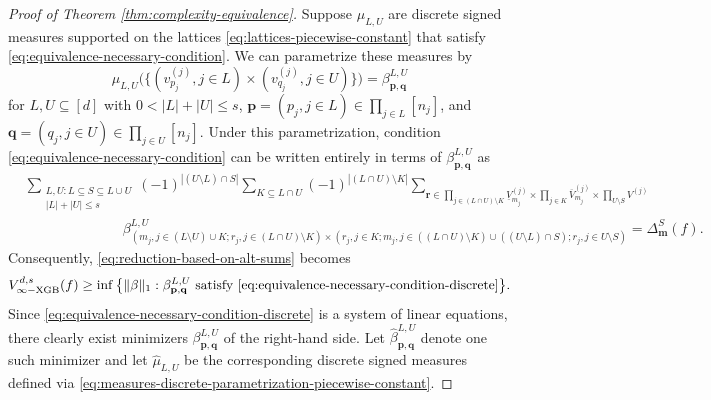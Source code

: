 \documentclass[10pt]{article}
\newcommand{\vinfxgb}{{V^{d, s}_{\infty-\text{XGB}}}}
\newcommand{\pbf}{{\mathbf{p}}}
\newcommand{\qbf}{{\mathbf{q}}}
\newcommand{\rbf}{{\mathbf{r}}}
\newcommand{\mbf}{{\mathbf{m}}}
\begin{document}
\begin{proof}[Proof of Theorem \ref{thm:complexity-equivalence}]
Suppose $\mu_{L, U}$ are discrete signed measures 
supported on the lattices \eqref{eq:lattices-piecewise-constant} that 
satisfy \eqref{eq:equivalence-necessary-condition}. 
We can parametrize these measures by 
\begin{equation}\label{eq:measures-discrete-parametrization-piecewise-constant}
    \mu_{L, U} \big(\{(v^{(j)}_{p_j}, j \in L)
    \times (v^{(j)}_{q_j}, j \in U)\}\big)
    = \beta^{L, U}_{\pbf, \qbf}
\end{equation}
for $L, U \subseteq [d]$ with $0 < |L| + |U| \le s$, 
$\pbf = (p_j, j \in L) \in \prod_{j \in L} [n_j]$, and
$\qbf = (q_j, j \in U) \in \prod_{j \in U} [n_j]$. 
Under this parametrization, condition 
\eqref{eq:equivalence-necessary-condition} can be written entirely in terms 
of $\beta^{L, U}_{\pbf, \qbf}$ as
\begingroup
\allowdisplaybreaks
\begin{align}\label{eq:equivalence-necessary-condition-discrete}
    &\sum_{\substack{L, U: L \subseteq S \subseteq L \cup U 
    \\ |L| + |U| \le s}} (-1)^{|(U \setminus L) \cap S|} 
    \sum_{K \subseteq L \cap U} (-1)^{|(L \cap U) \setminus K|} 
    \sum_{\rbf \in \prod\limits_{j \in (L \cap U) \setminus K} 
    \underline{V}^{(j)}_{m_j} 
    \times \prod\limits_{j \in K} \overline{V}^{(j)}_{m_j} 
    \times \prod\limits_{U \setminus S} V^{(j)}}  
    \nonumber \\
    &\qquad \qquad \qquad \quad \beta^{L, U}_{(m_j, j \in (L \setminus U) \cup K; 
    r_j, j \in (L \cap U) \setminus K) \times (r_j, j \in K; 
    m_j, j \in ((L \cap U) \setminus K) 
    \cup ((U \setminus L) \cap S); r_j, j \in U \setminus S)} 
    = \Delta^S_{\mbf}(f).
\end{align}
\endgroup
Consequently, \eqref{eq:reduction-based-on-alt-sums} becomes
\begin{equation*}
    \vinfxgb(f) \ge \inf \big\{\|\beta\|_1: 
    \beta^{L, U}_{\pbf, \qbf}
    \text{ satisfy 
    \eqref{eq:equivalence-necessary-condition-discrete}} \big\}.
\end{equation*}
Since \eqref{eq:equivalence-necessary-condition-discrete} is a system of 
linear equations, there clearly exist minimizers
$\beta^{L, U}_{\pbf, \qbf}$ of the right-hand side. Let 
$\hat{\beta}^{L, U}_{\pbf, \qbf}$ 
denote one such minimizer and let $\hat{\mu}_{L, U}$ be
the corresponding discrete signed measures defined via 
\eqref{eq:measures-discrete-parametrization-piecewise-constant}.
    

\end{proof}
\end{document}
